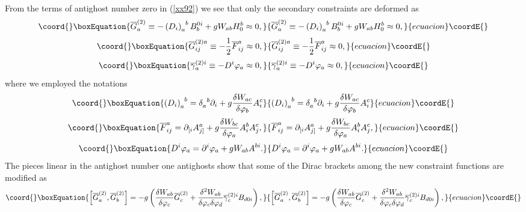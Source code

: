 \documentclass[a4paper,12pt]{article}
\begin{document}
From the terms of antighost number zero in (\ref{xx92}) we see that only the
secondary constraints are deformed as 
\begin{equation}\coord{}\boxEquation{
\overline{G}_{a}^{(2)}\equiv -\left( D_{i}\right)
_{a}^{\;\;b}B_{b}^{0i}+gW_{ab}H_{0}^{b}\approx 0,  \label{xx94}
}{
\overline{G}_{a}^{(2)}\equiv -\left( D_{i}\right)
_{a}^{\;\;b}B_{b}^{0i}+gW_{ab}H_{0}^{b}\approx 0,  }{ecuacion}\coordE{}\end{equation}
\begin{equation}\coord{}\boxEquation{
\overline{G}_{ij}^{(2)a}\equiv -\frac{1}{2}\overline{F}_{ij}^{a}\approx 0,
\label{xx95}
}{
\overline{G}_{ij}^{(2)a}\equiv -\frac{1}{2}\overline{F}_{ij}^{a}\approx 0,
}{ecuacion}\coordE{}\end{equation}
\begin{equation}\coord{}\boxEquation{
\overline{\gamma }_{a}^{(2)i}\equiv -D^{i}\varphi _{a}\approx 0,
\label{xx96}
}{
\overline{\gamma }_{a}^{(2)i}\equiv -D^{i}\varphi _{a}\approx 0,
}{ecuacion}\coordE{}\end{equation}
where we employed the notations 
\begin{equation}\coord{}\boxEquation{
\left( D_{i}\right) _{a}^{\;\;b}=\delta _{a}^{\;\;b}\partial _{i}+g\frac{
\delta W_{ac}}{\delta \varphi _{b}}A_{i}^{c}  \label{xx97}
}{
\left( D_{i}\right) _{a}^{\;\;b}=\delta _{a}^{\;\;b}\partial _{i}+g\frac{
\delta W_{ac}}{\delta \varphi _{b}}A_{i}^{c}  }{ecuacion}\coordE{}\end{equation}
\begin{equation}\coord{}\boxEquation{
\overline{F}_{ij}^{a}=\partial _{[i}A_{j]}^{a}+g\frac{\delta W_{bc}}{\delta
\varphi _{a}}A_{i}^{b}A_{j}^{c},  \label{xx98}
}{
\overline{F}_{ij}^{a}=\partial _{[i}A_{j]}^{a}+g\frac{\delta W_{bc}}{\delta
\varphi _{a}}A_{i}^{b}A_{j}^{c},  }{ecuacion}\coordE{}\end{equation}
\begin{equation}\coord{}\boxEquation{
D^{i}\varphi _{a}=\partial ^{i}\varphi _{a}+gW_{ab}A^{bi}.  \label{xx99}
}{
D^{i}\varphi _{a}=\partial ^{i}\varphi _{a}+gW_{ab}A^{bi}.  }{ecuacion}\coordE{}\end{equation}
The pieces linear in the antighost number one antighosts show that some of
the Dirac brackets among the new constraint functions are modified as 
\begin{equation}\coord{}\boxEquation{
\left[ \overline{G}_{a}^{(2)},\overline{G}_{b}^{(2)}\right] =-g\left( \frac{
\delta W_{ab}}{\delta \varphi _{c}}\overline{G}_{c}^{(2)}+\frac{\delta
^{2}W_{ab}}{\delta \varphi _{c}\delta \varphi _{d}}\overline{\gamma }
_{c}^{(2)i}B_{d0i}\right) ,  \label{xx100}
}{
\left[ \overline{G}_{a}^{(2)},\overline{G}_{b}^{(2)}\right] =-g\left( \frac{
\delta W_{ab}}{\delta \varphi _{c}}\overline{G}_{c}^{(2)}+\frac{\delta
^{2}W_{ab}}{\delta \varphi _{c}\delta \varphi _{d}}\overline{\gamma }
_{c}^{(2)i}B_{d0i}\right) ,  }{ecuacion}\coordE{}\end{equation}
\end{document}
